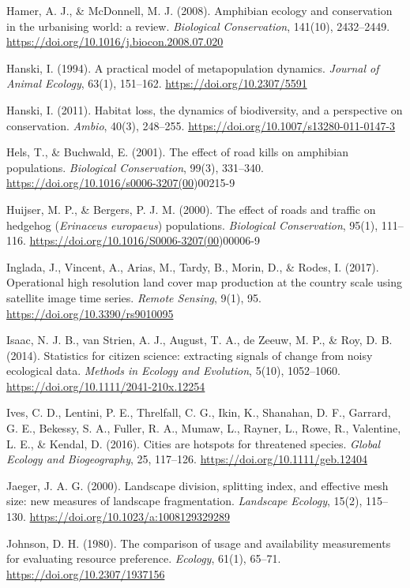 \documentclass[a4paper,11pt]{report}
\begin{document}
Hamer, A. J., \& McDonnell, M. J. (2008). Amphibian ecology and conservation in the urbanising world: a review. \textit{Biological Conservation}, 141(10), 2432--2449. \url{https://doi.org/10.1016/j.biocon.2008.07.020}

Hanski, I. (1994). A practical model of metapopulation dynamics. \textit{Journal of Animal Ecology}, 63(1), 151--162. \url{https://doi.org/10.2307/5591}

Hanski, I. (2011). Habitat loss, the dynamics of biodiversity, and a perspective on conservation. \textit{Ambio}, 40(3), 248--255. \url{https://doi.org/10.1007/s13280-011-0147-3}

Hels, T., \& Buchwald, E. (2001). The effect of road kills on amphibian populations. \textit{Biological Conservation}, 99(3), 331--340. \url{https://doi.org/10.1016/s0006-3207(00})00215-9

Huijser, M. P., \& Bergers, P. J. M. (2000). The effect of roads and traffic on hedgehog (\textit{Erinaceus europaeus}) populations. \textit{Biological Conservation}, 95(1), 111--116. \url{https://doi.org/10.1016/S0006-3207(00})00006-9

Inglada, J., Vincent, A., Arias, M., Tardy, B., Morin, D., \& Rodes, I. (2017). Operational high resolution land cover map production at the country scale using satellite image time series. \textit{Remote Sensing}, 9(1), 95. \url{https://doi.org/10.3390/rs9010095}

Isaac, N. J. B., van Strien, A. J., August, T. A., de Zeeuw, M. P., \& Roy, D. B. (2014). Statistics for citizen science: extracting signals of change from noisy ecological data. \textit{Methods in Ecology and Evolution}, 5(10), 1052--1060. \url{https://doi.org/10.1111/2041-210x.12254}

Ives, C. D., Lentini, P. E., Threlfall, C. G., Ikin, K., Shanahan, D. F., Garrard, G. E., Bekessy, S. A., Fuller, R. A., Mumaw, L., Rayner, L., Rowe, R., Valentine, L. E., \& Kendal, D. (2016). Cities are hotspots for threatened species. \textit{Global Ecology and Biogeography}, 25, 117--126. \url{https://doi.org/10.1111/geb.12404}

Jaeger, J. A. G. (2000). Landscape division, splitting index, and effective mesh size: new measures of landscape fragmentation. \textit{Landscape Ecology}, 15(2), 115--130. \url{https://doi.org/10.1023/a:1008129329289}

Johnson, D. H. (1980). The comparison of usage and availability measurements for evaluating resource preference. \textit{Ecology}, 61(1), 65--71. \url{https://doi.org/10.2307/1937156}
\end{document}
